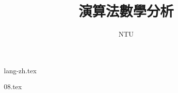 \documentclass[11pt, a4paper, fleqn]{book}
\begin{document}
{lang-zh.tex}


\title{\bfseries{\sc 演算法數學分析}}
\author{NTU}
\date{}
\maketitle

\tableofcontents

{08.tex}


\end{document}
